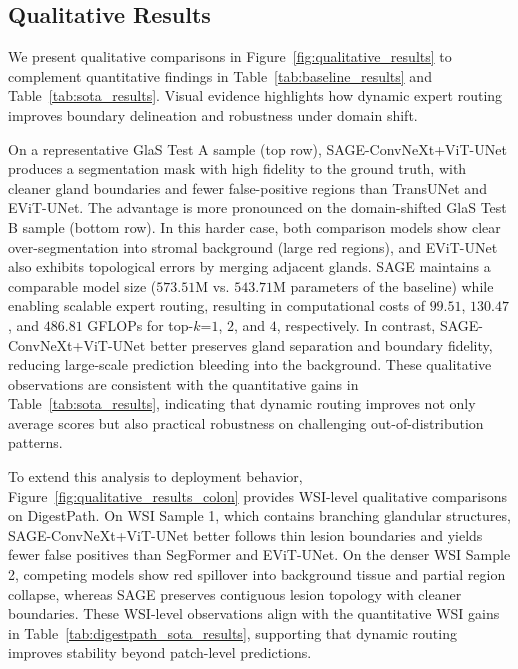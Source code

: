 \subsection{Qualitative Results}
\label{subsubsec:qualitative}

We present qualitative comparisons in Figure~\ref{fig:qualitative_results} to complement quantitative findings in Table~\ref{tab:baseline_results} and Table~\ref{tab:sota_results}. Visual evidence highlights how dynamic expert routing improves boundary delineation and robustness under domain shift.

On a representative GlaS Test A sample (top row), SAGE-ConvNeXt+ViT-UNet produces a segmentation mask with high fidelity to the ground truth, with cleaner gland boundaries and fewer false-positive regions than TransUNet and EViT-UNet. The advantage is more pronounced on the domain-shifted GlaS Test B sample (bottom row). In this harder case, both comparison models show clear over-segmentation into stromal background (large red regions), and EViT-UNet also exhibits topological errors by merging adjacent glands. SAGE maintains a comparable model size ($573.51$M vs. $543.71$M parameters of the baseline) while enabling scalable expert routing, resulting in computational costs of $99.51$, $130.47$, and $486.81$ GFLOPs for top-$k$=$1$, $2$, and $4$, respectively. In contrast, SAGE-ConvNeXt+ViT-UNet better preserves gland separation and boundary fidelity, reducing large-scale prediction bleeding into the background. These qualitative observations are consistent with the quantitative gains in Table~\ref{tab:sota_results}, indicating that dynamic routing improves not only average scores but also practical robustness on challenging out-of-distribution patterns.

To extend this analysis to deployment behavior, Figure~\ref{fig:qualitative_results_colon} provides WSI-level qualitative comparisons on DigestPath. On WSI Sample 1, which contains branching glandular structures, SAGE-ConvNeXt+ViT-UNet better follows thin lesion boundaries and yields fewer false positives than SegFormer and EViT-UNet. On the denser WSI Sample 2, competing models show red spillover into background tissue and partial region collapse, whereas SAGE preserves contiguous lesion topology with cleaner boundaries. These WSI-level observations align with the quantitative WSI gains in Table~\ref{tab:digestpath_sota_results}, supporting that dynamic routing improves stability beyond patch-level predictions.
